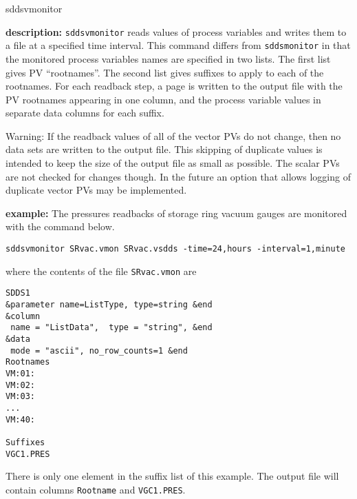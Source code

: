 %
%
\begin{sddsprog}{sddsvmonitor}
\item {\bf description:}
%
%
\verb+sddsvmonitor+ reads values of process variables and writes them to a file at a specified time interval.
This command differs from \verb+sddsmonitor+ in that the monitored
process variables names are specified in two lists.  The first list
gives PV ``rootnames''.  The second list gives suffixes to apply to
each of the rootnames. For each readback step, a page is written to
the output file with the PV rootnames appearing in one column, and the
process variable values in separate data columns for each suffix.

Warning: If the readback values of all of the vector PVs do not
change, then no data sets are written to the output file. This
skipping of duplicate values is intended to keep the size of the
output file as small as possible.  The scalar PVs are not checked for
changes though. In the future an option that allows logging of duplicate
vector PVs may be implemented.

\item {\bf example:} 
%
% 
%
The pressures readbacks of storage ring vacuum gauges are monitored with the command below.
\begin{verbatim}
sddsvmonitor SRvac.vmon SRvac.vsdds -time=24,hours -interval=1,minute
\end{verbatim}
where the contents of the file \verb+SRvac.vmon+ are
\begin{verbatim}
SDDS1
&parameter name=ListType, type=string &end
&column
 name = "ListData",  type = "string", &end
&data
 mode = "ascii", no_row_counts=1 &end
Rootnames
VM:01:
VM:02:
VM:03:
...
VM:40:

Suffixes
VGC1.PRES
\end{verbatim}
There is only one element in the suffix list of this example. The output file will contain columns
\verb+Rootname+ and \verb+VGC1.PRES+.


\end{sddsprog}
